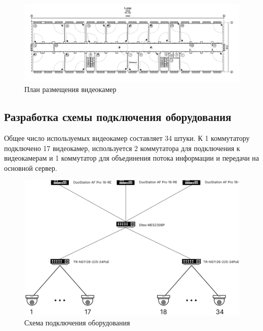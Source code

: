 \begin{figure}
    \begin{center}
        \includegraphics[width=240mm]{images/План размещения видеокамер}
    \end{center}
    \captionsetup{justification=centering}
    \caption{План размещения видеокамер}
    \label{fig::videocameras_placement}
\end{figure}


\subsection{Разработка схемы подключения оборудования}

Общее число используемых видеокамер составляет 34 штуки. К 1 коммутатору подключено 17 видеокамер, используется 2 коммутатора 
для подключения к видеокамерам и 1 коммутатор для объединения потока информации и передачи на основной сервер.

\begin{figure}[h]
    \begin{center}
        \includegraphics[width=160mm]{images/Схема подключения оборудования}
    \end{center}
    \captionsetup{justification=centering}
    \caption{Схема подключения оборудования}
    \label{fig::connections}
\end{figure}
